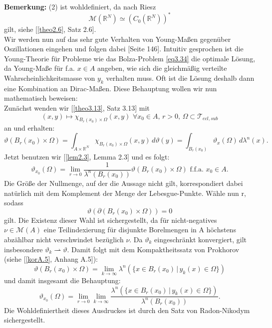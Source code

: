 \textbf{Bemerkung:} (2) ist wohldefiniert, da nach Riesz
\begin{equation}
    \mathcal{M}(\mathbb{R}^N) \simeq (C_0(\mathbb{R}^N))^*
\end{equation}
gilt, siehe [\ref{theo2.6}, Satz 2.6].\\

Wir werden nun auf das sehr gute Verhalten von Young-Maßen gegenüber Oszillationen eingehen und folgen dabei \cite{AttouchCalcVar}[Seite 146]. Intuitiv gesprochen ist die Young-Theorie für Probleme wie das Bolza-Problem \eqref{eq3.34} die optimale Lösung, da Young-Maße für f.a. \(x \in A\) angeben, wie sich die gleichmäßig verteilte Wahrscheinlichkeitsmasse von \(y_k\) verhalten muss. Oft ist die Lösung deshalb dann eine Kombination an Dirac-Maßen. Diese Behauptung wollen wir nun mathematisch beweisen:\\
Zunächst wenden wir [\ref{theo3.13}, Satz 3.13] mit 
\begin{equation}
    (x,y) \mapsto \chi_{B_r(x_0) \times \Omega} (x,y) \, \, \forall x_0 \in A, \, r > 0, \, \Omega \subset \mathcal{T}_{ecl,sub}
\end{equation}
an und erhalten:
\begin{equation}
    \vartheta(B_r(x_0) \times \Omega) = \int_{A \times \mathbb{R}^N} \chi_{B_r(x_0) \times \Omega} (x,y) \,d\vartheta(y) = \int_{B_r(x_0)} \vartheta_x(\Omega) \,d\lambda^n(x).
\end{equation}
Jetzt benutzen wir [\ref{lem2.3}, Lemma 2.3] und es folgt:
\begin{equation}
    \vartheta_{x_0} (\Omega) = \lim_{r \to 0} \frac{1}{\lambda^n(B_r(x_0))} \vartheta(B_r(x_0) \times \Omega) \text{ f.f.a. }x_0 \in A.
\end{equation}
Die Größe der Nullmenge, auf der die Aussage nicht gilt, korrespondiert dabei natürlich mit dem Komplement der Menge der Lebesgue-Punkte. Wähle nun r, sodass
\begin{equation}
    \vartheta(\partial(B_r(x_0) \times \Omega)) = 0
\end{equation}
gilt. Die Existenz dieser Wahl ist sichergestellt, da für nicht-negatives \(\nu \in \mathcal{M}(A)\) eine Teilindexierung für disjunkte Borelmengen in A höchstens abzählbar nicht verschwindet bezüglich \(\nu\). Da \(\vartheta_k\) eingeschränkt konvergiert, gilt insbesondere \(\vartheta_k \rightharpoonup \vartheta\). Damit folgt mit dem Kompaktheitssatz von Prokhorov (siehe [\ref{korA.5}, Anhang A.5]):
\begin{equation}
    \vartheta(B_r(x_0) \times \Omega) = \lim_{k \to \infty} \lambda^n(\{x \in B_r(x_0) \, | \, y_k(x) \in \Omega\})
\end{equation}
und damit insgesamt die Behauptung:
\begin{equation}
    \vartheta_{x_0}(\Omega) = \lim_{r \to 0} \lim_{k \to \infty} \frac{\lambda^n(\{x \in B_r(x_0) \, | \, y_k(x) \in \Omega\})}{\lambda^n(B_r(x_0))}.
\end{equation}
Die Wohldefiniertheit dieses Ausdruckes ist durch den Satz von Radon-Nikodym \\sichergestellt.
